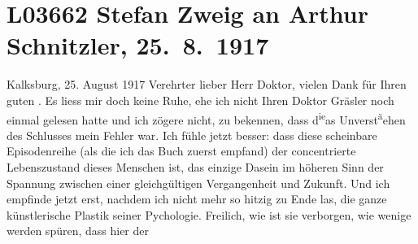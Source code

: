 

\section[Stefan Zweig an Arthur Schnitzler, 25. 8. 1917]{L03662 Stefan Zweig an Arthur Schnitzler, 25. 8. 1917}
\nopagebreak{}
\rehead{ }\normalsize\beginnumbering{}
\toendnotes[C]{\smallbreak\pagebreak[2]}
\toendnotes[C]{\smallbreak}
\pstart
           {\pb}Kalksburg, 25. August 1917\pend
           \vspace{0.5em}
\pstart
           Verehrter lieber Herr Doktor, vielen Dank für Ihren guten \label{K_L03662-1v}\label{K_L03662-1}. Es liess mir doch keine Ruhe, ehe ich nicht Ihren Doktor Gräsler noch einmal gelesen hatte und ich zögere
               nicht, zu bekennen, dass d\substVorne{}\textsuperscript{ie}\substDazwischen{}as\substHinten{} Unverst\substVorne{}\textsuperscript{ä}\substDazwischen{}ehen\substHinten{} des Schlusses mein Fehler war. Ich fühle 
               jetzt besser: dass diese scheinbare Episodenreihe (als die ich das Buch zuerst
               empfand) der concentrierte Lebenszustand dieses Menschen ist, das einzige Dasein im
               höheren Sinn der Spannung zwischen einer gleichgültigen Vergangenheit und Zukunft.
               Und ich empfinde jetzt erst, nachdem ich nicht mehr so hitzig zu Ende las, die ganze
                  {\pb}künstlerische Plastik seiner
               Pychologie. Freilich, wie ist sie verborgen, wie wenige werden spüren, dass hier der
